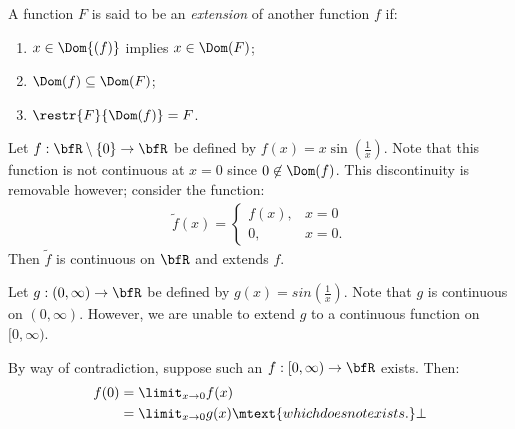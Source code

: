     \begin{definition}
        A function $F$ is said to be an \textit{extension} of another function $f$ if:
            \begin{enumerate}[label = (\arabic*)]
                \item $x \in \Dom{(f)}$ implies $x \in \Dom(F)$;
                \item $\Dom(f) \subseteq \Dom(F)$;
                \item $\restr{F}{\Dom(f)} = F$.
            \end{enumerate}
    \end{definition}

    \begin{example}
        Let $f:\bfR \setminus \{0\} \rightarrow \bfR$ be defined by $f(x) = x\sin \left(\frac{1}{x}\right)$. Note that this function is not continuous at $x = 0$ since $0 \not\in \Dom(f)$. This discontinuity is removable however; consider the function:
            \begin{equation*}
            \begin{split}
                \widetilde{f}(x)=
                \begin{cases}
                    f(x),&x = 0 \\
                    0,& x=0.
                \end{cases}
            \end{split}
            \end{equation*}
        Then $\widetilde{f}$ is continuous on $\bfR$ and extends $f$.
    \end{example}

    \begin{example}
        Let $g:(0,\infty) \rightarrow \bfR$ be defined by $g(x) = sin \left(\frac{1}{x}\right)$. Note that $g$ is continuous on $(0,\infty)$. However, we are unable to extend $g$ to a continuous function on $[0,\infty)$. \nl

        By way of contradiction, suppose such an $f:[0,\infty) \rightarrow \bfR$ exists. Then:
            \begin{equation*}
            \begin{split}
                f(0) 
                &= \limit_{x \rightarrow 0}f(x) \\
                &= \limit_{x \rightarrow 0}g(x) \mtext{which does not exists.}\bot\\
            \end{split}
            \end{equation*}
    \end{example}

